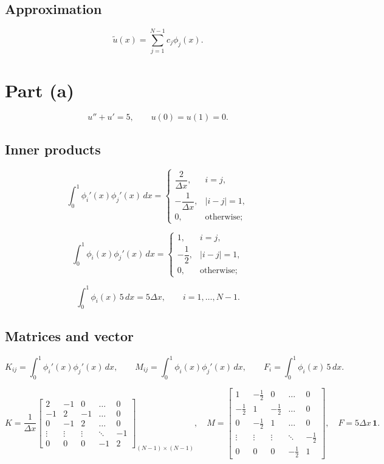 \documentclass{article}
\begin{document}
\subsection*{Approximation}

\[
\tilde u(x)=\sum_{j=1}^{N-1}c_j\phi_j(x).
\]

\bigskip
\section*{Part (a)}

\[
u''+u'=5,\qquad u(0)=u(1)=0.
\]

\subsection*{Inner products}

\vspace{-2ex}
\[
\int_0^1\phi_i'(x)\phi_j'(x)\,dx=
\begin{cases}
\dfrac{2}{\Delta x}, & i=j,\\[6pt]
-\dfrac{1}{\Delta x}, & |i-j|=1,\\[6pt]
0, & \text{otherwise};
\end{cases}
\]

\[
\int_0^1\phi_i(x)\phi_j'(x)\,dx=
\begin{cases}
1, & i=j,\\[6pt]
-\dfrac12, & |i-j|=1,\\[6pt]
0, & \text{otherwise};
\end{cases}
\]

\[
\int_0^1\phi_i(x)\,5\,dx=5\Delta x,\qquad i=1,\dots ,N-1.
\]

\subsection*{Matrices and vector}

\[
K_{ij}=\int_0^1\phi_i'(x)\phi_j'(x)\,dx,\qquad
M_{ij}=\int_0^1\phi_i(x)\phi_j'(x)\,dx,\qquad
F_i=\int_0^1\phi_i(x)\,5\,dx.
\]

\[
K=\frac1{\Delta x}
\begin{bmatrix}
 2&-1& 0&\dots &0\\
-1& 2&-1&\dots &0\\
 0&-1& 2&\dots &0\\
\vdots&\vdots&\vdots&\ddots&-1\\
 0& 0& 0&-1& 2
\end{bmatrix}_{(N-1)\times(N-1)},
\quad
M=
\begin{bmatrix}
 1&-\tfrac12&0&\dots &0\\
-\tfrac12&1&-\tfrac12&\dots &0\\
0&-\tfrac12&1&\dots &0\\
\vdots&\vdots&\vdots&\ddots&-\tfrac12\\
0&0&0&-\tfrac12&1
\end{bmatrix},
\quad
F=5\Delta x\,\mathbf 1.
\]
\end{document}
